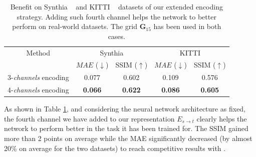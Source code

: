 \begin{table}[h!]
\begin{center}
\begin{tabular}{ccccc}
\hline
Method & \multicolumn{2}{c}{Synthia} & \multicolumn{2}{c}{KITTI} \\
 & $MAE$ ($\downarrow$) & SSIM ($\uparrow$) & $MAE$ ($\downarrow$) & SSIM ($\uparrow$) \\
\hline
3-\textit{channels} encoding &  0.077 & 0.602  & 0.109  & 0.576 \\ \hline
4-\textit{channels} encoding &  \textbf{0.066} &  \textbf{0.622} &  \textbf{0.086} &  \textbf{0.605}  \\ \hline
\hline
\end{tabular}
\end{center}
\caption{Benefit on Synthia ~\cite{ros2016synthia} and KITTI ~\cite{geiger2012we} datasets of our extended encoding strategy. Adding such fourth channel helps the network to better perform on real-world datasets. The grid $\textbf{G}_{15}$ has been used in both cases.}
\label{tab:compExtended}
\end{table}

As shown in Table \ref{tab:compExtended}, and considering the neural network architecture as fixed, the fourth channel we have added to our representation $E_{s\xrightarrow{}t}$ clearly helps the network to perform better in the task it has been trained for.  The SSIM gained more than 2 points on average while the MAE significantly decreased (by almost 20\% on average for the two datasets) to reach competitive results with \cite{kim2020novel}. 

